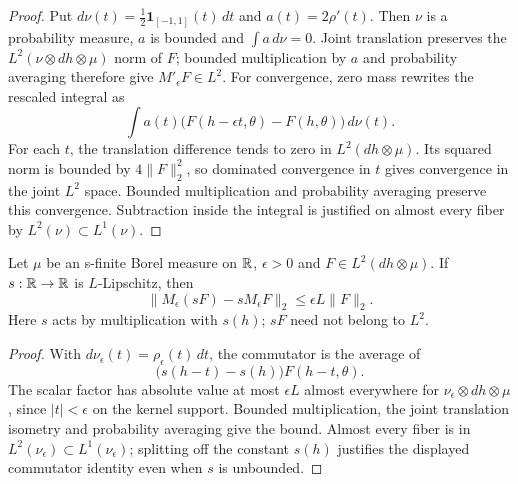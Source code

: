 \begin{proof}
\leanok
Put $d\nu(t)=\frac12\mathbf1_{[-1,1]}(t)\,dt$ and $a(t)=2\rho'(t)$.
Then $\nu$ is a probability measure, $a$ is bounded and $\int a\,d\nu=0$.
Joint translation preserves the $L^2(\nu\otimes dh\otimes\mu)$ norm of $F$;
bounded multiplication by $a$ and probability averaging therefore give
$M'_\epsilon F\in L^2$. For convergence, zero mass rewrites the rescaled
integral as
\[
  \int a(t)\bigl(F(h-\epsilon t,\theta)-F(h,\theta)\bigr)\,d\nu(t).
\]
For each $t$, the translation difference tends to zero in $L^2(dh\otimes\mu)$.
Its squared norm is bounded by $4\|F\|_2^2$, so dominated convergence in $t$
gives convergence in the joint $L^2$ space. Bounded multiplication and
probability averaging preserve this convergence. Subtraction inside the
integral is justified on almost every fiber by $L^2(\nu)\subset L^1(\nu)$.
\end{proof}

\begin{lemma}
\label{lem:line-mollifier-commutator}
\leanok
Let $\mu$ be an s-finite Borel measure on $\mathbb{R}$, $\epsilon>0$ and
$F\in L^2(dh\otimes\mu)$. If $s:\mathbb{R}\to\mathbb{R}$ is $L$-Lipschitz, then
\[
  \|M_\epsilon(sF)-sM_\epsilon F\|_2\le\epsilon L\|F\|_2.
\]
Here $s$ acts by multiplication with $s(h)$; $sF$ need not belong to $L^2$.
\end{lemma}

\begin{proof}
\leanok
With $d\nu_\epsilon(t)=\rho_\epsilon(t)\,dt$, the commutator is the average of
\[
  \bigl(s(h-t)-s(h)\bigr)F(h-t,\theta).
\]
The scalar factor has absolute value at most $\epsilon L$ almost everywhere
for $\nu_\epsilon\otimes dh\otimes\mu$, since $|t|<\epsilon$ on the kernel
support. Bounded multiplication, the joint translation isometry and
probability averaging give the bound. Almost every fiber is in
$L^2(\nu_\epsilon)\subset L^1(\nu_\epsilon)$; splitting off the constant
$s(h)$ justifies the displayed commutator identity even when $s$ is unbounded.
\end{proof}

